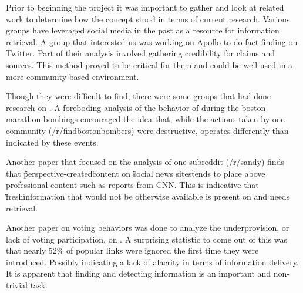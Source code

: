 Prior to beginning the project it was important to gather and look at related work to determine how the concept stood in terms of current research. Various groups have leveraged social media in the past as a resource for information retrieval. A group that interested us was working on Apollo to do fact finding on Twitter. Part of their analysis involved gathering credibility for claims and sources.\cite{Le:2011:DDL:2070942.2071018} This method proved to be critical for them and could be well used in a more community-based environment.


Though they were difficult to find, there were some groups that had done research on \reddit{}. A foreboding analysis of the behavior of \reddit{} during the boston marathon bombings encouraged the idea that, while the actions taken by one community (/r/findbostonbombers) were destructive, \reddit{} operates differently than indicated by these events. \cite{Potts:2013:IRC:2507065.2507079}

Another paper that focused on the analysis of one subreddit (/r/sandy) finds that \"perspective-created\" content on \"social news sites\" tends to place above professional content such as reports from CNN. \cite{Leavitt:2014:UHS:2556288.2557140} This is indicative that \"fresh\" information that would not be otherwise available is present on \reddit{} and needs retrieval.

Another paper on voting behaviors was done to analyze the underprovision, or lack of voting participation, on \reddit{}. A surprising statistic to come out of this was that nearly 52\% of popular links were ignored the first time they were introduced.\cite{Gilbert:2013:WUR:2441776.2441866} Possibly indicating a lack of alacrity in terms of information delivery. It is apparent that finding and detecting information is an important and non-trivial task.



